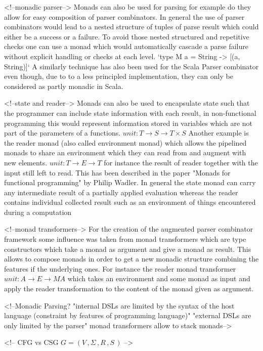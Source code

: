 <!--monadic parser-->
Monads can also be used for parsing for example do they allow for easy composition of parser combinators. In general the use of parser combinators would lead to a nested structure of tuples of parse result which could either be a success or a failure. To avoid those nested structured and repetitive checks one can use a monad which would automatically cascade a parse failure without explicit handling or checks at each level.
`type M a = String -> [(a, String)]`
A similarly technique has also been used for the Scala Parser combinator even though, due to to a less principled implementation, they can only be considered as partly monadic in Scala.

<!--state and reader-->
Monads can also be used to encapsulate state such that the programmer can include state information with each result, in non-functional programming this would represent information stored in variables which are not part of the parameters of a functions.
$unit: T \rightarrow S \rightarrow T \times S $
Another example is the reader monad (also called environment monad) which allows the pipelined monads to share an environment which they can read from and augment with new elements.
$unit: T \rightarrow E \rightarrow T $
for instance the result of reader together with the input still left to read. This has been described in the paper "Monads for functional programming" by Philip Wadler. In general the state monad can carry any intermediate result of a partially applied evaluation whereas the reader contains individual collected result such as an environment of things encountered during a computation

<!--monad transformers-->
For the creation of the augmented parser combinator framework some influence was taken from monad transformers which are type constructors which take a monad as argument and give a monad as result. This allows to compose monads in order to get a new monadic structure combining the features if the underlying ones. For instance the reader monad transformer
$unit: A \rightarrow E \rightarrow M A $ which takes an environment and some monad as input and apply the reader transformation to the content of the monad given as argument. 

<!--Monadic Parsing?
"internal DSLs are limited by the syntax of the host language (constraint by features of programming language)"
"external DSLs are only limited by the parser"
monad transformers allow to stack monads-->

<!-- CFG vs CSG $G = (V\,, \Sigma\,, R\,, S\,) $ -->

